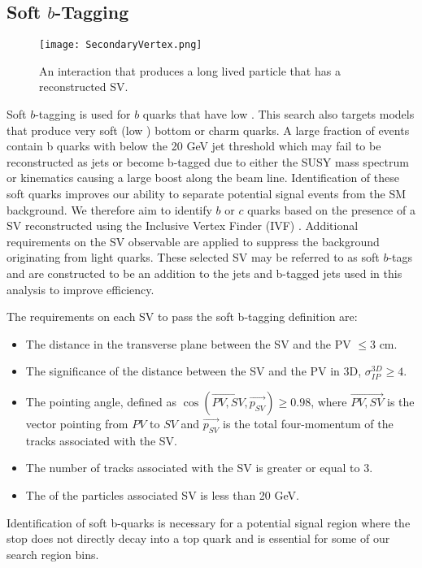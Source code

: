 \subsection{Soft $b$-Tagging}\label{SV} 

\begin{figure}
 	\centering
	\texttt{[image: SecondaryVertex.png]}
 	\caption[Secondary Vertex Diagram]{An interaction that produces a long lived particle that has a reconstructed SV.}
 	\label{SecondaryVertex} 
\end{figure}

Soft $b$-tagging is used for $b$ quarks that have low \pt. This search also targets models that produce very soft (low \pt) bottom or charm quarks. A large fraction of events contain b quarks with \pt{} below the 20 GeV jet threshold which may fail to be reconstructed as jets or become b-tagged due to either the SUSY mass spectrum or kinematics causing a large boost along the beam line. Identification of these soft quarks improves our ability to separate potential signal events from the SM background. We therefore aim to identify $b$ or $c$ quarks based on the presence of a SV reconstructed using the Inclusive Vertex Finder (IVF) \cite{noauthor_https://twiki.cern.ch/twiki/bin/view/main/inclusivesecondaryvertexfinder_nodate, fruehwirth_new_2003}. Additional requirements on the SV observable are applied to suppress the background originating from light quarks. These selected SV may be referred to as soft $b$-tags and are constructed to be an addition to the jets and b-tagged jets used in this analysis to improve efficiency. 

The requirements on each SV to pass the soft b-tagging definition are:
\begin{itemize}
	 \item The distance in the transverse plane between the SV and the PV $\leq3$ cm.
	 \item The significance of the distance between the SV and the PV in 3D, $\sigma_{IP}^{3D}\geq4$.
	 \item The pointing angle, defined as $\cos(\overrightarrow{PV,SV},\overrightarrow{p_{SV}})\geq0.98$, where $\overrightarrow{PV,SV}$ is the vector pointing from $PV$ to $SV$ and $\overrightarrow{p_{SV}}$ is the total four-momentum of the tracks associated with the SV. 
	 \item The number of tracks associated with the SV is greater or equal to 3.
	 \item The \pt{} of the particles associated SV is less than 20 GeV.
\end{itemize}
Identification of soft b-quarks is necessary for a potential signal region where the stop does not directly decay into a top quark and is essential for some of our search region bins. 

